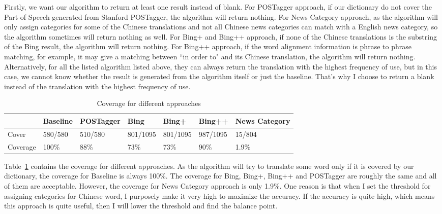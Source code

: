 \documentclass[11pt]{article}
\begin{document}
Firstly, we want our algorithm to return at least one result instead of blank. For POSTagger approach, if our dictionary do not cover the Part-of-Speech generated from Stanford POSTagger, the algorithm will return nothing. For News Category approach, as the algorithm will only assign categories for some of the Chinese translations and not all Chinese news categories can match with a English news category, so the algorithm sometimes will return nothing as well. For Bing+ and Bing++ approach, if none of the Chinese translations is the substring of the Bing result, the algorithm will return nothing. For Bing++ approach, if the word alignment information is phrase to phrase matching, for example, it may give a matching between ``in order to" and its Chinese translation, the algorithm will return nothing. Alternatively, for all the listed algorithm listed above, they can always return the translation with the highest frequency of use, but in this case, we cannot know whether the result is generated from the algorithm itself or just the baseline. That's why I choose to return a blank instead of the translation with the highest frequency of use.


\begin{table}[ht]
  \caption{Coverage for different approaches}
  \label{table:evaluation_1}
  \begin{tabular}{| p{2cm} | p{1.8cm} | p{1.8cm} | p{1.8cm} | p{1.8cm} | p{1.8cm} | p{1.8cm} |}   
    \hline
    & Baseline & POSTagger & Bing & Bing+ & Bing++ & News Category \\
    \hline
    Cover & 580/580 & 510/580 & 801/1095 & 801/1095 & 987/1095 & 15/804 \\
    \hline
    Coverage & 100\% & 88\% & 73\% & 73\% & 90\% & 1.9\%\\
    \hline
  \end{tabular}
\end{table}

Table~\ref{table:evaluation_1} contains the coverage for different approaches. As the algorithm will try to translate some word only if it is covered by our dictionary, the coverage for Baseline is always 100\%. The coverage for Bing, Bing+, Bing++ and POSTagger are roughly the same and all of them are acceptable. However, the coverage for News Category approach is only 1.9\%. One reason is that when I set the threshold for assigning categories for Chinese word, I purposely make it very high to maximize the accuracy. If the accuracy is quite high, which means this approach is quite useful, then I will lower the threshold and find the balance point.
\end{document}
